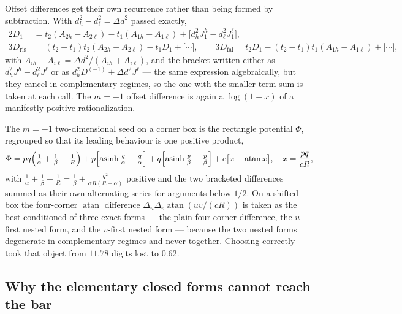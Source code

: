 \documentclass[11pt]{article}
\theoremstyle{remark}
\newcommand{\asinh}{\operatorname{asinh}}
\newcommand{\atan}{\operatorname{atan}}
\begin{document}
Offset differences get their own recurrence rather than being formed by subtraction. With
$d_h^2 - d_\ell^2 = \Delta d^2$ passed exactly,
\begin{equation}
\begin{aligned}
2 D_1 &= t_2(A_{2h}-A_{2\ell}) - t_1(A_{1h}-A_{1\ell}) + \bigl[d_h^2 J_1^{h} - d_\ell^2 J_1^{\ell}\bigr],\\
3 D_{\mathrm{ris}} &= (t_2-t_1)t_2(A_{2h}-A_{2\ell}) - t_1 D_1 + \bigl[\cdots\bigr],\qquad
3 D_{\mathrm{fal}} = t_2 D_1 - (t_2-t_1)t_1(A_{1h}-A_{1\ell}) + \bigl[\cdots\bigr],
\end{aligned}
\end{equation}
with $A_{ih} - A_{i\ell} = \Delta d^2/(A_{ih}+A_{i\ell})$, and the bracket written either
as $d_h^2 J^h - d_\ell^2 J^\ell$ or as $d_h^2 D^{(-1)} + \Delta d^2 J^\ell$ --- the same
expression algebraically, but they cancel in complementary regimes, so the one with the
smaller term sum is taken at each call. The $m = -1$ offset difference is again a
$\log(1+x)$ of a manifestly positive rationalization.

The $m = -1$ two-dimensional seed on a corner box is the rectangle potential $\Phi$,
regrouped so that its leading behaviour is one positive product,
\begin{equation}
\Phi = pq\Bigl(\tfrac1\alpha + \tfrac1\beta - \tfrac1R\Bigr)
 + p\Bigl[\asinh\tfrac{q}{\alpha} - \tfrac{q}{\alpha}\Bigr]
 + q\Bigl[\asinh\tfrac{p}{\beta} - \tfrac{p}{\beta}\Bigr] + c\bigl[x - \atan x\bigr],
\quad x = \frac{pq}{cR},
\end{equation}
with $\tfrac1\alpha + \tfrac1\beta - \tfrac1R = \tfrac1\beta + \tfrac{q^2}{\alpha R(R+\alpha)}$
positive and the two bracketed differences summed as their own alternating series for
arguments below $1/2$. On a shifted box the four-corner $\atan$ difference
$\Delta_u\Delta_v\atan(uv/(cR))$ is taken as the best conditioned of three exact forms ---
the plain four-corner difference, the $u$-first nested form, and the $v$-first nested
form --- because the two nested forms degenerate in complementary regimes and never
together. Choosing correctly took that object from $11.78$ digits lost to $0.62$.

\subsection{Why the elementary closed forms cannot reach the bar}
\label{sec:centred}
\end{document}
